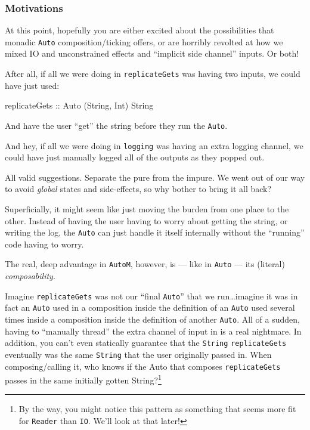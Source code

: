 \documentclass[]{article}
\newenvironment{Shaded}{}{}
\newcommand{\DataTypeTok}[1]{\textcolor[rgb]{0.56,0.13,0.00}{#1}}
\newcommand{\NormalTok}[1]{#1}
\newcommand{\OtherTok}[1]{\textcolor[rgb]{0.00,0.44,0.13}{#1}}
\begin{document}
\subsubsection{Motivations}\label{motivations}

At this point, hopefully you are either excited about the possibilities that
monadic \texttt{Auto} composition/ticking offers, or are horribly revolted at
how we mixed IO and unconstrained effects and ``implicit side channel'' inputs.
Or both!

After all, if all we were doing in \texttt{replicateGets} was having two inputs,
we could have just used:

\begin{Shaded}
\begin{Highlighting}[]
\OtherTok{replicateGets\textquotesingle{} ::} \DataTypeTok{Auto}\NormalTok{ (}\DataTypeTok{String}\NormalTok{, }\DataTypeTok{Int}\NormalTok{) }\DataTypeTok{String}
\end{Highlighting}
\end{Shaded}

And have the user ``get'' the string before they run the \texttt{Auto}.

And hey, if all we were doing in \texttt{logging} was having an extra logging
channel, we could have just manually logged all of the outputs as they popped
out.

All valid suggestions. Separate the pure from the impure. We went out of our way
to avoid \emph{global} states and side-effects, so why bother to bring it all
back?

Superficially, it might seem like just moving the burden from one place to the
other. Instead of having the user having to worry about getting the string, or
writing the log, the \texttt{Auto} can just handle it itself internally without
the ``running'' code having to worry.

The real, deep advantage in \texttt{AutoM}, however, is --- like in
\texttt{Auto} --- its (literal) \emph{composability}.

Imagine \texttt{replicateGets\textquotesingle{}} was not our ``final
\texttt{Auto}'' that we run\ldots imagine it was in fact an \texttt{Auto} used
in a composition inside the definition of an \texttt{Auto} used several times
inside a composition inside the definition of another \texttt{Auto}. All of a
sudden, having to ``manually thread'' the extra channel of input in is a real
nightmare. In addition, you can't even statically guarantee that the
\texttt{String} \texttt{replicateGets} eventually was the same \texttt{String}
that the user originally passed in. When composing/calling it, who knows if the
Auto that composes \texttt{replicateGets\textquotesingle{}} passes in the same
initially gotten String?\footnote{By the way, you might notice this pattern as
  something that seems more fit for \texttt{Reader} than \texttt{IO}. We'll look
  at that later!}
\end{document}
